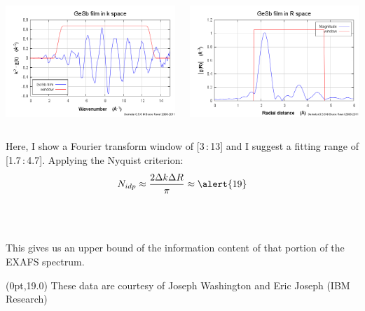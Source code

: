 \documentclass[10pt, xcolor=x11names, compress]{beamer}
\begin{document}
\begin{frame}
  \begin{columns}
    \begin{column}{0.5\linewidth}
      \begin{center}
        \includegraphics[width=0.8\linewidth]{info/gesb_chik.png}
      \end{center}
    \end{column}
    \begin{column}{0.5\linewidth}
      \begin{center}
        \includegraphics[width=0.8\linewidth]{info/gesb_chir.png}
      \end{center}
    \end{column}
  \end{columns}
  Here, I show a Fourier transform window of [3\,:\,13] and I suggest a
  fitting range of [1.7\,:\,4.7].  Applying the Nyquist criterion:
  \begin{equation}
    \notag N_{idp} \approx \frac{2\Delta k\Delta R}{\pi} \approx \alert{19}
  \end{equation}

  ~\\[-7ex]
  ~

  \begin{exampleblock}{}
    \begin{center}
      This gives us an upper bound of the information content of that
      portion of the EXAFS spectrum.
    \end{center}
  \end{exampleblock}
  \begin{textblock*}{0.4\linewidth}(0pt,19.0\TPVertModule)%
    \tiny%
    These data are courtesy of Joseph Washington and Eric
    Joseph (IBM Research)
  \end{textblock*}
\end{frame}
\end{document}
